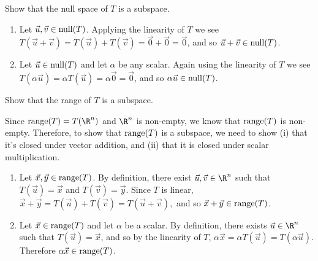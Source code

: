 	\begin{parts}
		\item Show that the null space of $T$ is a subspace.
			\begin{solution}
				\begin{enumerate}[label=(\roman*)]
					\item Let $\vec u,\vec v\in\operatorname{null}(T)$.
						Applying the linearity of $T$ we see
						$T(\vec u+\vec v)=T(\vec u)+T(\vec v)=\vec 0+\vec 0=\vec 0$,
						and so $\vec u+\vec v\in\operatorname{null}(T)$.
					\item Let $\vec u\in\operatorname{null}(T)$ and let $\alpha$ be any scalar.
						Again using the linearity of $T$ we see
						$T(\alpha\vec u)=\alpha T(\vec u)=\alpha\vec 0=\vec 0$,
						and so $\alpha\vec u\in\operatorname{null}(T)$.
				\end{enumerate}
			\end{solution}
		\item Show that the range of $T$ is a subspace.
			\begin{solution}
				Since $\Range(T)=T(\R^n)$ and $\R^n$ is non-empty, we know that $\operatorname{range}(T)$ is non-empty.
				Therefore, to show that $\operatorname{range}(T)$ is a subspace, we need to show (i) that it's closed under vector addition,
				and (ii) that it is closed under scalar multiplication.
				\begin{enumerate}[label=(\roman*)]
					\item Let $\vec x,\vec y\in\operatorname{range}(T)$.
						By definition, there exist $\vec u,\vec v\in\R^n$ such that $T(\vec u)=\vec x$
						and $T(\vec v)=\vec y$. Since $T$ is linear,
						$
							\vec x+\vec y=T(\vec u)+T(\vec v)=T(\vec u+\vec v),
						$
						and so $\vec x+\vec y\in\operatorname{range}(T)$.
					\item Let $\vec x\in\operatorname{range}(T)$ and let $\alpha$ be a scalar.
						By definition, there exists $\vec u\in\R^n$ such that $T(\vec u)=\vec x$,
						and so by the linearity of $T$,
						$
						\alpha\vec x=\alpha T(\vec u)=T(\alpha\vec u).
						$
						Therefore $\alpha\vec x\in\operatorname{range}(T)$.
				\end{enumerate}
			\end{solution}
	\end{parts}

